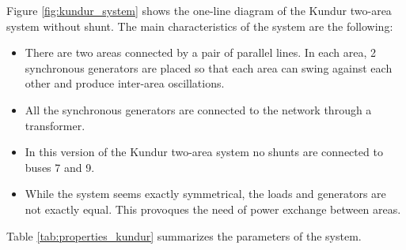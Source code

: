 Figure \ref{fig:kundur_system} shows the one-line diagram of the Kundur two-area system without shunt. The main characteristics of the system are the following:
\begin{itemize}
    \item There are two areas connected by a pair of parallel lines. In each area, 2 synchronous generators are placed so that each area can swing against 
    each other and produce inter-area oscillations.
    \item All the synchronous generators are connected to the network through a transformer.
    \item In this version of the Kundur two-area system no shunts are connected to buses 7 and 9.
    \item While the system seems exactly symmetrical, the loads and generators are not exactly equal. This provoques the need of power exchange between areas.
\end{itemize}

Table \ref{tab:properties_kundur} summarizes the parameters of the system.

